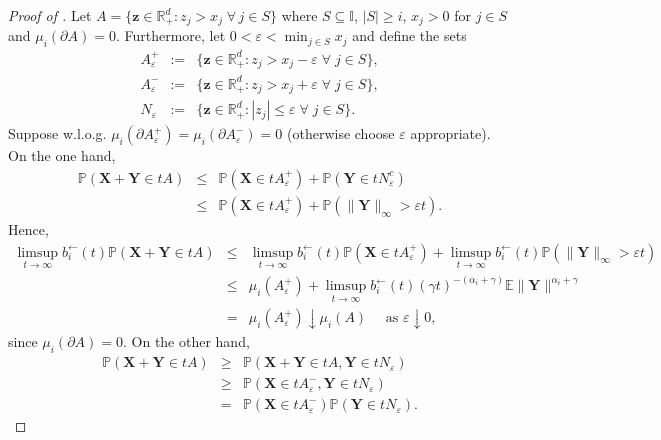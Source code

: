 \documentclass[aos]{imsart}
\numberwithin{equation}{section}
\theoremstyle{plain} %
\theoremstyle{remark}
\newcommand{\E}{\mathbb{E}}
\renewcommand\P{\mathbb{P}}
\newcommand{\R}{\mathbb{R}}
\def\bX{\boldsymbol X}
\def\bY{\boldsymbol Y}
\def\bz{\boldsymbol z}
\begin{document}
\begin{proof}[Proof of ]
Let $A= \{\bz \in \R_+^d: z_j>x_j\;\forall\, j\in S\}$ where $S\subseteq \mathbb{I}$, $|S|\ge i$, $x_j>0$ for $j\in S$ and $\mu_i(\partial A)=0$. Furthermore, let $0<\varepsilon<\min_{j\in S}x_j$ and define the sets
\begin{eqnarray*}
    A_{\varepsilon}^+&:=&\{\bz \in \R_+^d: z_j>x_j-\varepsilon \; \forall\; j\in S\},\\
    A_{\varepsilon}^-&:=&\{\bz \in \R_+^d: z_j>x_j+\varepsilon \; \forall\; j\in S\},\\
    N_{\varepsilon}&:=&\{\bz \in \R_+^d: |z_j|\leq \varepsilon \;\forall\; j\in S\}.
\end{eqnarray*}
Suppose w.l.o.g. $\mu_i(\partial A_{\varepsilon}^+)=\mu_i(\partial A_{\varepsilon}^-)=0$ (otherwise choose $\varepsilon$ appropriate).
On the one hand,
\begin{eqnarray*}
    \P(\bX+\bY\in tA)%
    &\leq &\P(\bX\in tA_{\varepsilon}^+)
    +\P(\bY\in tN_{\varepsilon}^c)\\
    &\leq &\P(\bX\in tA_{\varepsilon}^+)
    +\P(\|\bY\|_{\infty}>\varepsilon t).
\end{eqnarray*}
Hence,
\begin{eqnarray}
    \limsup_{t\to\infty}b_i^{\leftarrow}(t)
    \P(\bX+\bY\in tA)
    &\leq &\limsup_{t\to\infty}b_i^{\leftarrow}(t)
    \P(\bX\in tA_{\varepsilon}^+)
    +\limsup_{t\to\infty}b_i^{\leftarrow}(t)
    \P(\|\bY\|_{\infty}>\varepsilon t) \nonumber\\
    &\leq& \mu_i(A_{\varepsilon}^+)+
        \limsup_{t\to\infty}b_i^{\leftarrow}(t)(\gamma t)^{-(\alpha_i+\gamma)}\E\|\bY\|^{\alpha_i+\gamma} \nonumber\\
    &=&\mu_i(A_{\varepsilon}^+)\downarrow \mu_i(A) \quad \text{ as } \varepsilon\downarrow 0, \label{eq:lem2.9:sup}
\end{eqnarray}
since $\mu_i(\partial A)=0$. On the other hand,
\begin{eqnarray*}
    \P(\bX+\bY\in tA)%
    &\geq &\P(\bX+\bY\in tA, \bY\in tN_{\varepsilon})\\
    &\geq &\P(\bX\in tA_{\varepsilon}^-, \bY\in tN_{\varepsilon})\\
    &=&\P(\bX\in tA_{\varepsilon}^-)\P(\bY\in tN_{\varepsilon}). 

\end{eqnarray*}
\end{proof}
\end{document}
